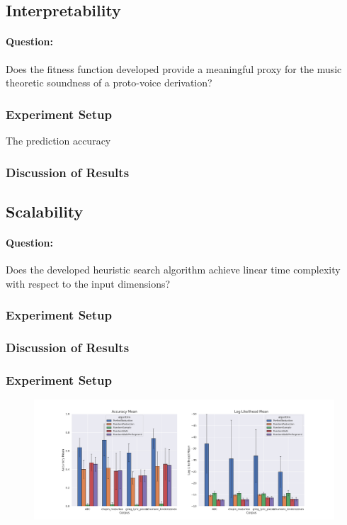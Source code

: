 \documentclass[12pt,a4paper,twoside,openany]{report} \usepackage[pdfborder={0 0 0}]{hyperref}    %
\theoremstyle{definition} \newtheorem{definition}{Definition}[section]
\begin{document}
  \subsection{Interpretability}
  \label{sub:evalInterpret}
  \paragraph{Question:} {Does the fitness function developed provide a meaningful proxy for the music theoretic
  soundness of a proto-voice derivation?}
  \subsubsection{Experiment Setup}
  The prediction accuracy 


  \subsubsection{Discussion of Results}

  \subsection{Scalability}
  \paragraph{Question:} {Does the developed heuristic search algorithm achieve linear time complexity with respect to the input dimensions?}
  \label{sub:evalExtScale}
  \subsubsection{Experiment Setup}


  \subsubsection{Discussion of Results}

  \subsubsection{Experiment Setup}

  \begin{figure}[ht]

    \includegraphics[width=\textwidth]{figs/eval/baselineResults.png}
    \caption{}
    \label{fig:baseRes}
  \end{figure}
  
\end{document}
